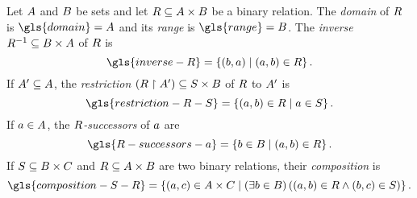 
Let $A$ and $B$ be sets and let $R\subseteq A\times B$ be a
binary relation.
The \emph{domain} of $R$ is $\gls{domain} = A$ and its \emph{range} is
$\gls{range} = B$.
The \emph{inverse} $R^{-1}\subseteq B\times A$ of $R$ is
\[
  \gls{inverse-R} = 
  \setbd{(\eb, \ea)}{(\ea, \eb) \in \relR}.
\]
If $A'\subseteq A$, the \emph{restriction}
$(R\restriction A') \subseteq S\times B$ of $R$ to $A'$ is
\[
  \gls{restriction-R-S} =
  \setbd{(\ea, \eb) \in \relR}{\ea \in \setS}.
\]
If $a \in A$, the \emph{$R$-successors} 
of $a$ are
\[
  \gls{R-successors-a} =
  \setbd{\eb \in \setB}{(\ea, \eb) \in \relR}.
\]
If $S \subseteq B \times C$ and $R \subseteq A \times B$
are two binary relations, their \emph{composition} is 
\[
  \gls{composition-S-R} =
  \setbd{(\ea, \ec) \in \setA \cprod \setC}{
  (\exists \eb \in \setB)\left((\ea, \eb)
  \in \relR \land (\eb, \ec) \in \relS\right)}.
\]